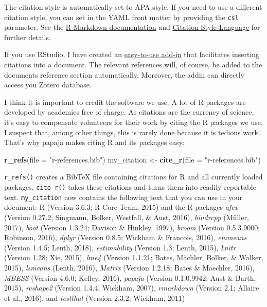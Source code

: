 \documentclass[english,man,floatsintext]{apa6}
\newenvironment{Shaded}{\begin{snugshade}}{\end{snugshade}}
\newcommand{\DataTypeTok}[1]{\textcolor[rgb]{0.13,0.29,0.53}{#1}}
\newcommand{\KeywordTok}[1]{\textcolor[rgb]{0.13,0.29,0.53}{\textbf{#1}}}
\newcommand{\NormalTok}[1]{#1}
\newcommand{\StringTok}[1]{\textcolor[rgb]{0.31,0.60,0.02}{#1}}
\begin{document}
The citation style is automatically set to APA style.
If you need to use a different citation style, you can set in the YAML front matter by providing the \texttt{csl} parameter.
See the \href{http://rmarkdown.rstudio.com/authoring_bibliographies_and_citations.html}{R Markdown documentation} and \href{http://citationstyles.org/}{Citation Style Language} for further details.

If you use RStudio, I have created an \href{https://github.com/crsh/citr}{easy-to-use add-in} that facilitates inserting citations into a document.
The relevant references will, of course, be added to the documents reference section automatically.
Moreover, the addin can directly access you Zotero database.

I think it is important to credit the software we use.
A lot of R packages are developed by academics free of charge.
As citations are the currency of science, it's easy to compensate volunteers for their work by citing the R packages we use.
I suspect that, among other things, this is rarely done because it is tedious work.
That's why papaja makes citing R and its packages easy:

\begin{Shaded}
\begin{Highlighting}[]
\KeywordTok{r_refs}\NormalTok{(}\DataTypeTok{file =} \StringTok{"r-references.bib"}\NormalTok{)}
\NormalTok{my_citation <-}\StringTok{ }\KeywordTok{cite_r}\NormalTok{(}\DataTypeTok{file =} \StringTok{"r-references.bib"}\NormalTok{)}
\end{Highlighting}
\end{Shaded}

\texttt{r\_refs()} creates a BibTeX file containing citations for R and all currently loaded packages.
\texttt{cite\_r()} takes these citations and turns them into readily reportable text.
\texttt{my\_citation} now contains the following text that you can use in your document: R (Version 3.6.3; R Core Team, 2015) and the R-packages \emph{afex} (Version 0.27.2; Singmann, Bolker, Westfall, \& Aust, 2016), \emph{bindrcpp} (Müller, 2017), \emph{boot} (Version 1.3.24; Davison \& Hinkley, 1997), \emph{broom} (Version 0.5.3.9000; Robinson, 2016), \emph{dplyr} (Version 0.8.5; Wickham \& Francois, 2016), \emph{emmeans} (Version 1.4.5; Lenth, 2018), \emph{estimability} (Version 1.3; Lenth, 2015), \emph{knitr} (Version 1.28; Xie, 2015), \emph{lme4} (Version 1.1.21; Bates, Mächler, Bolker, \& Walker, 2015), \emph{lsmeans} (Lenth, 2016), \emph{Matrix} (Version 1.2.18; Bates \& Maechler, 2016), \emph{MBESS} (Version 4.6.0; Kelley, 2016), \emph{papaja} (Version 0.1.0.9942; Aust \& Barth, 2015), \emph{reshape2} (Version 1.4.4; Wickham, 2007), \emph{rmarkdown} (Version 2.1; Allaire et al., 2016), and \emph{testthat} (Version 2.3.2; Wickham, 2011)
\end{document}
